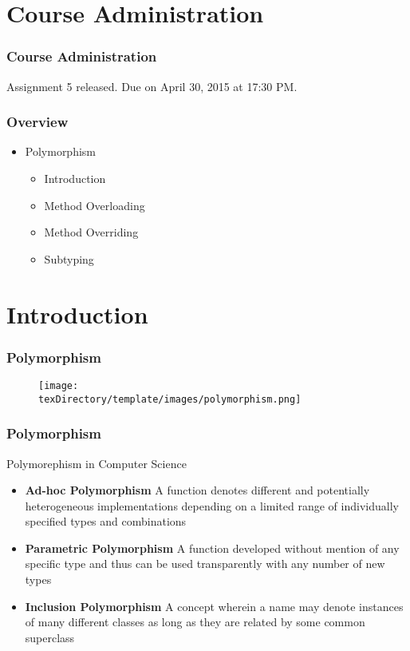 \documentclass[10pt, compress]{beamer}
\begin{document}
\prepareCover

\section{Course Administration}

\begin{frame}[fragile]
\frametitle{Course Administration}
Assignment 5 released. Due on April 30, 2015 at 17:30 PM.
\end{frame}

\begin{frame}[fragile]
	\frametitle{Overview}
	\begin{itemize}
		\item[] Polymorphism
		\begin{itemize}
			\item[] Introduction
			\item[] Method Overloading
			\item[] Method Overriding
			\item[] Subtyping
		\end{itemize}
	\end{itemize}
\end{frame}


\section{Introduction}

\begin{frame}[fragile]
	\frametitle{Polymorphism}
	\begin{figure}\centering
		\texttt{[image: \\texDirectory/template/images/polymorphism.png]}
	\end{figure}
\end{frame}

\begin{frame}[fragile]
	\frametitle{Polymorphism}
	\begin{block}{Polymorephism in Computer Science}
		\begin{itemize}
			\item[] \textbf{Ad-hoc Polymorphism} A function denotes different and potentially heterogeneous implementations depending on a limited range of individually specified types and combinations
			\item[] \textbf{Parametric Polymorphism} A function developed without mention of any specific type and thus can be used transparently with any number of new types
			\item[] \textbf{Inclusion Polymorphism} A concept wherein a name may denote instances of many different classes as long as they are related by some common superclass
		\end{itemize}
	\end{block}
\end{frame}
\end{document}
